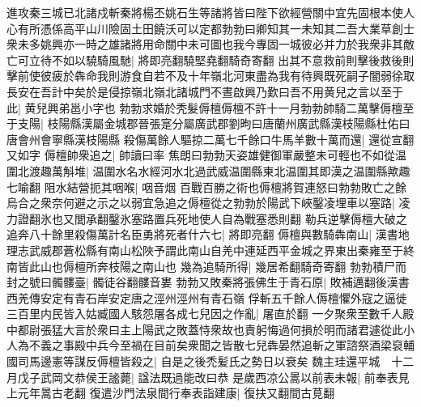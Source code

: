 進攻秦三城已北諸戍斬秦將楊丕姚石生等諸將皆曰陛下欲經營關中宜先固根本使人心有所憑係高平山川險固土田饒沃可以定都勃勃曰卿知其一未知其二吾大業草創士衆未多姚興亦一時之雄諸將用命關中未可圖也我今專固一城彼必并力於我衆非其敵亡可立待不如以驍騎風馳|{
	將即亮翻驍堅堯翻騎奇寄翻}
出其不意救前則擊後救後則擊前使彼疲於犇命我則游食自若不及十年嶺北河東盡為我有待興既死嗣子闇弱徐取長安在吾計中矣於是侵掠嶺北嶺北諸城門不晝啟興乃歎曰吾不用黄兒之言以至于此|{
	黄兒興弟邕小字也}
勃勃求婚於秃髮傉檀傉檀不許十一月勃勃帥騎二萬擊傉檀至于支陽|{
	枝陽縣漢屬金城郡晉張寔分屬廣武郡劉昫曰唐蘭州廣武縣漢枝陽縣杜佑曰唐會州會寧縣漢枝陽縣}
殺傷萬餘人驅掠二萬七千餘口牛馬羊數十萬而還|{
	還從宣翻又如字}
傉檀帥衆追之|{
	帥讀曰率}
焦朗曰勃勃天姿雄健御軍嚴整未可輕也不如從温圍北渡趣萬斛堆|{
	温圍水名水經河水北過武威温圍縣東北温圍其即漢之温圍縣歟趣七喻翻}
阻水結營扼其咽喉|{
	咽音烟}
百戰百勝之術也傉檀將賀連怒曰勃勃敗亡之餘烏合之衆奈何避之示之以弱宜急追之傉檀從之勃勃於陽武下峽鑿凌埋車以塞路|{
	凌力證翻氷也又閭承翻鑿氷塞路置兵死地使人自為戰塞悉則翻}
勒兵逆擊傉檀大破之追奔八十餘里殺傷萬計名臣勇將死者什六七|{
	將即亮翻}
傉檀與數騎犇南山|{
	漢書地理志武威郡蒼松縣有南山松陜予謂此南山自羌中連延西平金城之界東出秦雍至于終南皆此山也傉檀所奔枝陽之南山也}
幾為追騎所得|{
	幾居希翻騎奇寄翻}
勃勃積尸而封之號曰髑髏臺|{
	髑徒谷翻髏音婁}
勃勃又敗秦將張佛生于青石原|{
	敗補邁翻後漢書西羌傳安定有青石岸安定唐之涇州涇州有青石嶺}
俘斬五千餘人傉檀懼外寇之逼徙三百里内民皆入姑臧國人駭怨屠各成七兒因之作亂|{
	屠直於翻}
一夕聚衆至數千人殿中都尉張猛大言於衆曰主上陽武之敗蓋恃衆故也責躬悔過何損於明而諸君遽從此小人為不義之事殿中兵今至禍在目前矣衆聞之皆散七兒犇晏然追斬之軍諮祭酒梁裒輔國司馬邊憲等謀反傉檀皆殺之|{
	自是之後禿髪氏之勢日以衰矣}
魏主珪還平城　十二月戊子武岡文恭侯王謐薨|{
	諡法既過能改曰恭}
是歲西凉公暠以前表未報|{
	前奉表見上元年暠古老翻}
復遣沙門法泉間行奉表詣建康|{
	復扶又翻間古莧翻}


